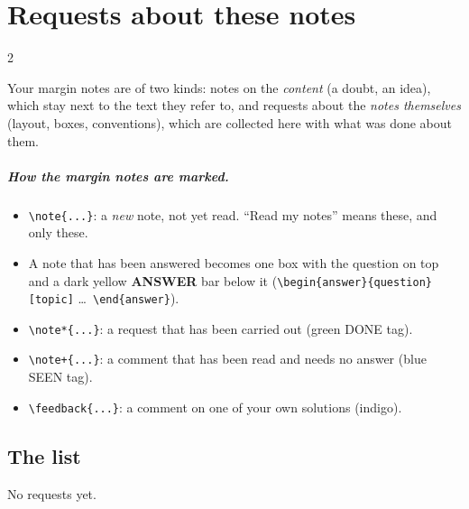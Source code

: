 \chapter*{Requests about these notes}\label{ch:requests}
\begin{paracol}{2}

Your margin notes are of two kinds: notes on the \emph{content} (a doubt, an idea), which stay next to the
text they refer to, and requests about the \emph{notes themselves} (layout, boxes, conventions), which are
collected here with what was done about them.

\paragraph{How the margin notes are marked.}
\begin{itemize}
  \item \verb|\note{...}|: a \emph{new} note, not yet read. ``Read my notes'' means these, and only these.
  \item A note that has been answered becomes one box with the question on top and a dark yellow
        \textbf{ANSWER} bar below it (\verb|\begin{answer}{question}[topic]| \dots\ \verb|\end{answer}|).
  \item \verb|\note*{...}|: a request that has been carried out (green DONE tag).
  \item \verb|\note+{...}|: a comment that has been read and needs no answer (blue SEEN tag).
  \item \verb|\feedback{...}|: a comment on one of your own solutions (indigo).
\end{itemize}

\section*{The list}
No requests yet.

\flushside
\end{paracol}
